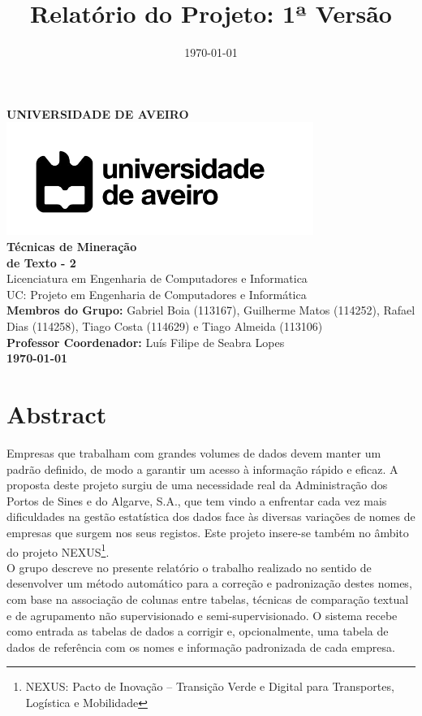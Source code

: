 \documentclass[a4paper,12pt]{article}
\title{Relatório do Projeto: 1ª Versão}
\date{\today}
\begin{document}
\begin{center}
    \large\textbf{UNIVERSIDADE DE AVEIRO} \\[1.5cm]
    
    \includegraphics[width=10cm]{images/Universidade-de-Aveiro.png} \\[1.5cm]
    
    \Huge \textbf{Técnicas de Mineração\\ de Texto - 2} \\[1.5cm]

    \normalsize Licenciatura em Engenharia de Computadores e Informatica \\[0.5cm]
    UC: Projeto em Engenharia de Computadores e Informática \\[0.5cm]
    \textbf{Membros do Grupo:} Gabriel Boia (113167), Guilherme Matos (114252), Rafael Dias (114258), Tiago Costa (114629) e Tiago Almeida (113106) \\[0.5cm]
    \textbf{Professor Coordenador:} Luís Filipe de Seabra Lopes \\[2cm]
    \vfill
    \textbf{\today} \\[1cm]
\end{center}
\newpage

\newpage
\tableofcontents
\newpage

\section{Abstract}
Empresas que trabalham com grandes volumes de dados devem manter um padrão definido, de modo a garantir um acesso à informação rápido e eficaz. A proposta deste projeto surgiu de uma necessidade real da Administração dos Portos de Sines e do Algarve, S.A., que tem vindo a enfrentar cada vez mais dificuldades na gestão estatística dos dados face às diversas variações de nomes de empresas que surgem nos seus registos. Este projeto insere-se também no âmbito do projeto NEXUS\footnote{NEXUS: Pacto de Inovação – Transição Verde e Digital para Transportes, Logística e Mobilidade}.
\\
O grupo descreve no presente relatório o trabalho realizado no sentido de desenvolver um método automático para a correção e padronização destes nomes, com base na associação de colunas entre tabelas, técnicas de comparação textual e de agrupamento não supervisionado e semi-supervisionado. O sistema recebe como entrada as tabelas de dados a corrigir e, opcionalmente, uma tabela de dados de referência com os nomes e informação padronizada de cada empresa.
\end{document}
